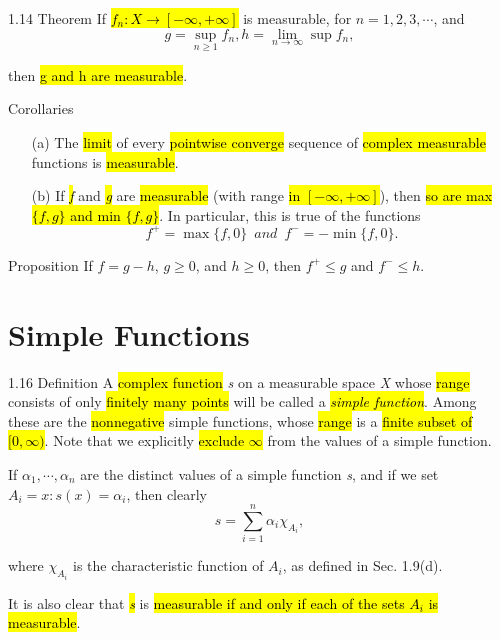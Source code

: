 \documentclass{article}
\begin{document}
\begin{theo}{1.14 Theorem}
If \hl{$f_n: X\rightarrow[-\infty,+\infty]$} is measurable, for $n=1,2,3,\cdots$, and 
\begin{displaymath}
  g=\sup_{n\ge 1} f_n, h=\lim_{n\rightarrow\infty} \sup f_n,
\end{displaymath}
 
then \hl{g and h are measurable}.
\end{theo}

\begin{theo}{Corollaries}
\begin{enumerate}
  \item [(a)] The \hl{limit} of every \hl{pointwise converge} sequence of \hl{complex measurable} functions is \hl{measurable}.
  \item [(b)] If \hl{\textit{f}} and \hl{\textit{g}} are \hl{measurable} (with range \hl{in $[-\infty,+\infty]$}), then \hl{so are max $\{f,g\}$ and min $\{f,g\}$}. In particular, this is true of the functions
  \begin{displaymath}
  f^+=\max\{f,0\}\enspace and\enspace f^-=-\min\{f,0\}.
\end{displaymath}

\end{enumerate}
	
\end{theo}

\begin{prop}{Proposition}
If $f=g-h$, $g\ge0$, and $h\ge0$, then $f^+\le g$ and $f^-\le h$.	
\end{prop}

\section*{Simple Functions}

\begin{defi}{1.16 Definition}
A \hl{complex function} \textit{s} on a measurable space \textit{X} whose \hl{range} consists of only \hl{finitely many points} will be called a \hl{\textit{simple function}}. Among these are the \hl{nonnegative} simple functions, whose \hl{range} is a \hl{finite subset of $[0,\infty)$}. Note that we explicitly \hl{exclude $\infty$} from the values of a simple function.

\vspace{0.2cm}

If $\alpha_1,\cdots,\alpha_n$ are the distinct values of a simple function \textit{s}, and if we set $A_i={x:s(x)=\alpha_i}$, then clearly
\begin{displaymath}
  s=\sum^n_{i=1}\alpha_i\chi_{A_i},
\end{displaymath}

where $\chi_{A_i}$ is the characteristic function of $A_i$, as defined in Sec. 1.9(d).

\vspace{0.2cm}

It is also clear that \hl{\textit{s}} is \hl{measurable if and only if each of the sets $A_i$ is measurable}. 


\end{defi}
\end{document}
